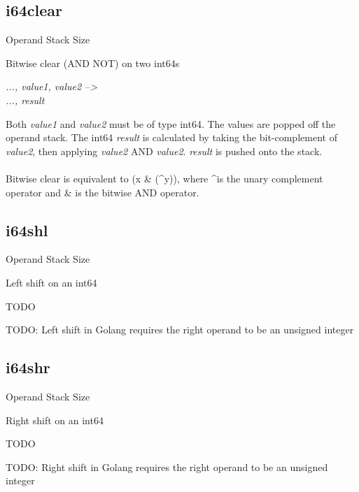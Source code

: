 \documentclass[12pt]{article}
\begin{document}
		\subsection*{i64clear}
			\begin{labeling}{Operand Stack Size}
				\item [\textbf{Operation}] Bitwise clear (AND NOT) on two int64s
				\item [\textbf{Format}] 
				\item [\textbf{Operand Stack}] \textit{..., value1, value2 --\textgreater } \\
										\textit{..., result}
				\item [\textbf{Description}] Both \textit{value1} and \textit{value2} must be of type int64. The values are popped off the operand stack. The int64 \textit{result} is calculated by taking the bit-complement of \textit{value2}, then applying \textit{value2} AND \textit{value2}. \textit{result} is pushed onto the stack. \\ \\
				Bitwise clear is equivalent to (x \& (\textasciicircum y)), where \textasciicircum is the unary complement operator and \& is the bitwise AND operator. 
			\end{labeling}
			
		\newpage
		\subsection*{i64shl}
			\begin{labeling}{Operand Stack Size}
				\item [\textbf{Operation}] Left shift on an int64
				\item [\textbf{Format}] 
				\item [\textbf{Operand Stack}] TODO
				\item [\textbf{Description}] TODO: Left shift in Golang requires the right operand to be an unsigned integer
			\end{labeling}	
			
		\newpage
		\subsection*{i64shr}
			\begin{labeling}{Operand Stack Size}
				\item [\textbf{Operation}] Right shift on an int64
				\item [\textbf{Format}] 
				\item [\textbf{Operand Stack}] TODO
				\item [\textbf{Description}] TODO: Right shift in Golang requires the right operand to be an unsigned integer
			\end{labeling}	
			
\end{document}
